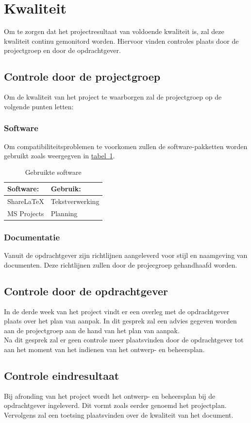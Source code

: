 \documentclass[numbers=endperiod]{scrartcl}
\newcommand{\sectionSmall}[1]{
	\vspace{-10pt}
	\section{#1}
	\vspace{-5pt}
}
\newcommand{\whitespace}{\vspace*{2 mm} \\}%
\newcommand{\tableref}[1]{\hyperref[table:#1]{tabel~\ref{table:#1}}}
\begin{document}
	\sectionSmall{Kwaliteit}
	Om te zorgen dat het projectresultaat van voldoende kwaliteit is, zal deze kwaliteit continu gemonitord worden. Hiervoor vinden controles plaats door de projectgroep en door de opdrachtgever.
	\subsection{Controle door de projectgroep}
	Om de kwaliteit van het project te waarborgen zal de projectgroep op de volgende punten letten:
	\subsubsection{Software}
	Om compatibiliteitsproblemen te voorkomen zullen de software-pakketten worden gebruikt zoals weergegven in \tableref{Software}.
	
	\begin{table}[h]
		\caption{Gebruikte software}\label{table:Software}
		
		\centering
		\begin{tabular}{ p{} | p{} }
			Software:	    & Gebruik:          \\ \hline
			ShareLaTeX   	& Tekstverwerking	\\
			MS Projects    	& Planning  		\\
		\end{tabular}
		
	\end{table}
	
	\subsubsection{Documentatie}
	Vanuit de opdrachtgever zijn richtlijnen aangeleverd voor stijl en naamgeving van documenten. Deze richtlijnen zullen door de projecgroep gehandhaafd worden. \cite{Grit:2015:Book}
	
	\subsection{Controle door de opdrachtgever}
	In de derde week van het project vindt er een overleg met de opdrachtgever plaats over het plan van aanpak. In dit gesprek zal een advies gegeven worden aan de projectgroep aan de hand van het plan van aanpak.
	\whitespace
	Na dit gesprek zal er geen controle meer plaatsvinden door de opdrachtgever tot aan het moment van het indienen van het ontwerp- en beheersplan.
	\subsection{Controle eindresultaat}
	Bij afronding van het project wordt het ontwerp- en beheersplan bij de opdrachtgever ingeleverd. Dit vormt zoals eerder genoemd het projectplan. Vervolgens zal een toetsing plaatsvinden over de kwaliteit van het document. 
	
\end{document}
